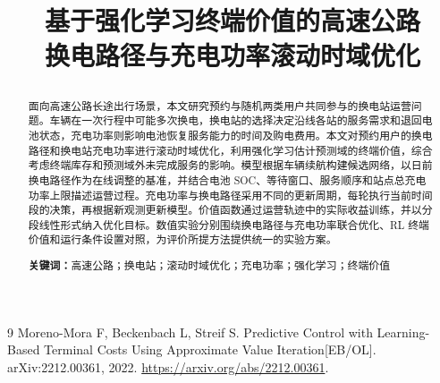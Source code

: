 \documentclass[12pt,a4paper,UTF8]{ctexart}
\title{\vspace{1.6cm}\heiti\LARGE 基于强化学习终端价值的高速公路\\[0.4em]换电路径与充电功率滚动时域优化\par\vspace{1.2cm}}
\author{\relax}
\date{}
\numberwithin{equation}{section}
\begin{document}
\cover
\thispagestyle{empty}
\clearpage
\begin{abstract}
面向高速公路长途出行场景，本文研究预约与随机两类用户共同参与的换电站运营问题。车辆在一次行程中可能多次换电，换电站的选择决定沿线各站的服务需求和退回电池状态，充电功率则影响电池恢复服务能力的时间及购电费用。本文对预约用户的换电路径和换电站充电功率进行滚动时域优化，利用强化学习估计预测域的终端价值，综合考虑终端库存和预测域外未完成服务的影响。模型根据车辆续航构建候选网络，以日前换电路径作为在线调整的基准，并结合电池 SOC、等待窗口、服务顺序和站点总充电功率上限描述运营过程。充电功率与换电路径采用不同的更新周期，每轮执行当前时间段的决策，再根据新观测更新模型。价值函数通过运营轨迹中的实际收益训练，并以分段线性形式纳入优化目标。数值实验分别围绕换电路径与充电功率联合优化、RL 终端价值和运行条件设置对照，为评价所提方法提供统一的实验方案。

\medskip
\noindent\textbf{关键词：}高速公路；换电站；滚动时域优化；充电功率；强化学习；终端价值
\end{abstract}
\clearpage
\tableofcontents
\clearpage







\appendix

\begin{thebibliography}{9}
Moreno-Mora F, Beckenbach L, Streif S.
Predictive Control with Learning-Based Terminal Costs Using Approximate Value Iteration[EB/OL].
arXiv:2212.00361, 2022.
\url{https://arxiv.org/abs/2212.00361}.
\end{thebibliography}
\end{document}
